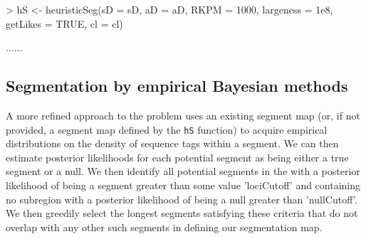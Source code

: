 \documentclass[a4paper]{article}
\begin{document}
\begin{Schunk}
\begin{Sinput}
> hS <- heuristicSeg(sD = sD, aD = aD, RKPM = 1000, largeness = 1e8, getLikes = TRUE, cl = cl)
\end{Sinput}
\begin{Soutput}
......
\end{Soutput}
\end{Schunk}

\subsection*{Segmentation by empirical Bayesian methods}

A more refined approach to the problem uses an existing segment map (or, if not provided, a segment map defined by the \verb'hS' function) to acquire empirical distributions on the density of sequence tags within a segment. We can then estimate posterior likelihoods for each potential segment as being either a true segment or a null. We then identify all
potential segments in the with a posterior likelihood of being a segment
greater than some value 'lociCutoff' and containing no subregion with a posterior
likelihood of being a null greater than 'nullCutoff'. We then greedily
select the longest segments satisfying these criteria that do not
overlap with any other such segments in defining our segmentation map.
\end{document}

